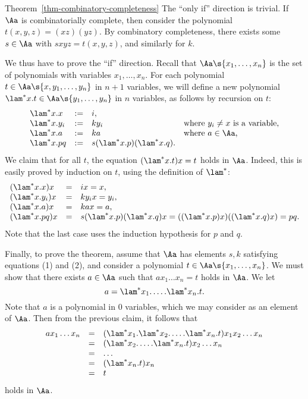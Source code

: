 \documentclass[12pt]{article}
\begin{document}
\begin{proofof}{Theorem~\ref{thm-combinatory-completeness}}
  The ``only if'' direction is trivial. If $\Aa$ is combinatorially
  complete, then consider the polynomial $t(x,y,z)=(xz)(yz)$. By
  combinatory completeness, there exists some $s\in\Aa$ with
  $sxyz=t(x,y,z)$, and similarly for $k$.
  
  We thus have to prove the ``if'' direction.  Recall that
  $\Aa\s{x_1,\ldots,x_n}$ is the set of polynomials with variables
  $x_1,\ldots,x_n$. For each polynomial $t\in\Aa\s{x,y_1,\ldots,y_n}$ in
  $n+1$ variables, we will define a new polynomial $\lam^*x.t \in
  \Aa\s{y_1,\ldots,y_n}$ in $n$ variables, as follows by recursion on
  $t$:
  \[ \begin{array}{llll}
    \lam^*x.x &:=& i,\\
    \lam^*x.y_i &:=& ky_i & \mbox{where $y_i\neq x$ is a variable,} \\
    \lam^*x.a &:=& ka     & \mbox{where $a\in \Aa$,}\\
    \lam^*x.pq &:=& s(\lam^*x.p)(\lam^*x.q). \\
  \end{array}
  \]
  We claim that for all $t$, the equation $(\lam^* x.t)x = t$ holds
  in $\Aa$. Indeed, this is easily proved by induction on $t$, using
  the definition of $\lam^*$:
  \[ \begin{array}{llll}
    (\lam^*x.x)x &=& ix = x,\\
    (\lam^*x.y_i)x &=& ky_ix = y_i,\\
    (\lam^*x.a)x &=& kax = a,\\
    (\lam^*x.pq)x &=& s(\lam^*x.p)(\lam^*x.q)x = ((\lam^*x.p)x)((\lam^*x.q)x) = pq. \\
  \end{array}
  \]
  Note that the last case uses the induction hypothesis for $p$ and $q$. 
  
  Finally, to prove the theorem, assume that $\Aa$ has elements $s,k$
  satisfying equations (1) and (2), and consider a polynomial
  $t\in\Aa\s{x_1,\ldots,x_n}$. We must show that there exists $a\in\Aa$
  such that $ax_1\ldots x_n = t$ holds in $\Aa$. We let
  \[ a = \lam^*x_1.\ldots.\lam^*x_n.t.
  \]
  Note that $a$ is a polynomial in $0$ variables, which we may
  consider as an element of $\Aa$. Then from the previous claim, it
  follows that
  \[ \begin{array}{lll}
    ax_1\ldots x_n &=& (\lam^*x_1.\lam^*x_2.\ldots.\lam^*x_n.t)x_1x_2\ldots x_n\\
    &=& (\lam^*x_2.\ldots.\lam^*x_n.t)x_2\ldots x_n\\
    &=& \ldots\\
    &=& (\lam^*x_n.t)x_n\\
    &=& t\\
  \end{array}
  \]
  holds in $\Aa$. \eot
\end{proofof}
\end{document}
